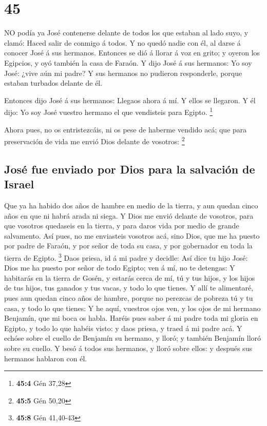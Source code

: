 \hypertarget{section-44}{%
\section{45}\label{section-44}}

 NO podía ya José contenerse delante de todos los que
estaban al lado suyo, y clamó: Haced salir de conmigo á todos. Y no
quedó nadie con él, al darse á conocer José á sus hermanos. 
Entonces se dió á llorar á voz en grito; y oyeron los Egipcios, y oyó
también la casa de Faraón.  Y dijo José á sus hermanos: Yo
soy José: ¿vive aún mi padre? Y sus hermanos no pudieron responderle,
porque estaban turbados delante de él.

 Entonces dijo José á sus hermanos: Llegaos ahora á mí. Y
ellos se llegaron. Y él dijo: Yo soy José vuestro hermano el que
vendisteis para Egipto. \footnote{\textbf{45:4} Gén 37,28}

 Ahora pues, no os entristezcáis, ni os pese de haberme
vendido acá; que para preservación de vida me envió Dios delante de
vosotros: \footnote{\textbf{45:5} Gén 50,20}

\hypertarget{josuxe9-fue-enviado-por-dios-para-la-salvaciuxf3n-de-israel}{%
\subsection{José fue enviado por Dios para la salvación de
Israel}\label{josuxe9-fue-enviado-por-dios-para-la-salvaciuxf3n-de-israel}}

 Que ya ha habido dos años de hambre en medio de la tierra,
y aun quedan cinco años en que ni habrá arada ni siega.  Y
Dios me envió delante de vosotros, para que vosotros quedaseis en la
tierra, y para daros vida por medio de grande salvamento. 
Así pues, no me enviasteis vosotros acá, sino Dios, que me ha puesto por
padre de Faraón, y por señor de toda su casa, y por gobernador en toda
la tierra de Egipto. \footnote{\textbf{45:8} Gén 41,40-43} 
Daos priesa, id á mi padre y decidle: Así dice tu hijo José: Dios me ha
puesto por señor de todo Egipto; ven á mí, no te detengas: 
Y habitarás en la tierra de Gosén, y estarás cerca de mí, tú y tus
hijos, y los hijos de tus hijos, tus ganados y tus vacas, y todo lo que
tienes.  Y allí te alimentaré, pues aun quedan cinco años
de hambre, porque no perezcas de pobreza tú y tu casa, y todo lo que
tienes:  Y he aquí, vuestros ojos ven, y los ojos de mi
hermano Benjamín, que mi boca os habla.  Haréis pues saber
á mi padre toda mi gloria en Egipto, y todo lo que habéis visto: y daos
priesa, y traed á mi padre acá.  Y echóse sobre el cuello
de Benjamín su hermano, y lloró; y también Benjamín lloró sobre su
cuello.  Y besó á todos sus hermanos, y lloró sobre ellos:
y después sus hermanos hablaron con él.

